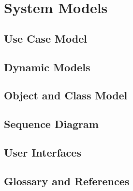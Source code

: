 \documentclass[a4paper,12pt]{report}
\begin{document}
	\chapter{System Models}
	\section{Use Case Model}
	\section{Dynamic Models}
	\section{Object and Class Model}
	\section{Sequence Diagram}
	\section{User Interfaces}
	\section{Glossary and References}
\end{document}

